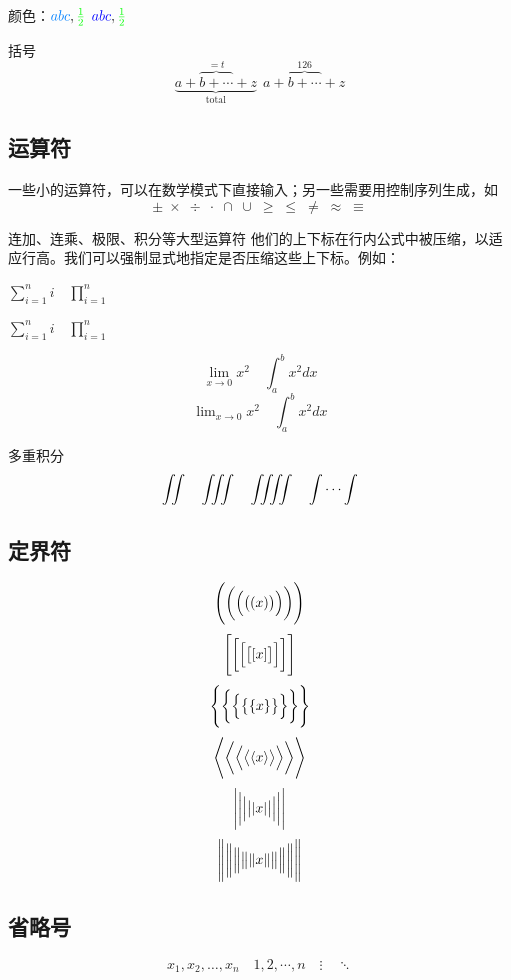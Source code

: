 颜色：$\textcolor[rgb]{0.00,0.50,1.00}{abc}, \color{green}{\frac{1}{2}}$   ${\color{blue}abc}, \color{green}{\frac{1}{2}}$ 

括号
\begin{equation}
    \underbrace{a + \overbrace{b+\cdots}^{{}=t}+z}_{\text{total}}~~ 
    a+{\overbrace{b+\cdots}}^{126}+z
\end{equation}


\subsection{运算符} 

一些小的运算符，可以在数学模式下直接输入；另一些需要用控制序列生成，如
\[ \pm\; \times \; \div\; \cdot\; \cap\; \cup\;
\geq\; \leq\; \neq\; \approx \; \equiv \]

连加、连乘、极限、积分等大型运算符 %
他们的上下标在行内公式中被压缩，以适应行高。我们可以强制显式地指定是否压缩这些上下标。例如：

$ \sum_{i=1}^n i\quad \prod_{i=1}^n $ 

$ \sum\limits _{i=1}^n i\quad \prod\limits _{i=1}^n $

\[ \lim_{x\to0}x^2 \quad \int_a^b x^2 dx \]
\[ \lim\nolimits _{x\to0}x^2\quad \int\nolimits_a^b x^2 dx \]

多重积分
\[ \iint\quad \iiint\quad \iiiint\quad \idotsint \]

\subsection{定界符}

\[ \Biggl(\biggl(\Bigl(\bigl((x)\bigr)\Bigr)\biggr)\Biggr) \]
\[ \Biggl[\biggl[\Bigl[\bigl[[x]\bigr]\Bigr]\biggr]\Biggr] \]
\[ \Biggl \{\biggl \{\Bigl \{\bigl \{\{x\}\bigr \}\Bigr \}\biggr \}\Biggr\} \]
\[ \Biggl\langle\biggl\langle\Bigl\langle\bigl\langle\langle x
\rangle\bigr\rangle\Bigr\rangle\biggr\rangle\Biggr\rangle \]
\[ \Biggl\lvert\biggl\lvert\Bigl\lvert\bigl\lvert\lvert x
\rvert\bigr\rvert\Bigr\rvert\biggr\rvert\Biggr\rvert \]
\[ \Biggl\lVert\biggl\lVert\Bigl\lVert\bigl\lVert\lVert x
\rVert\bigr\rVert\Bigr\rVert\biggr\rVert\Biggr\rVert \]

\subsection{省略号}
\[ x_1,x_2,\dots ,x_n\quad 1,2,\cdots ,n\quad
\vdots\quad \ddots \]

